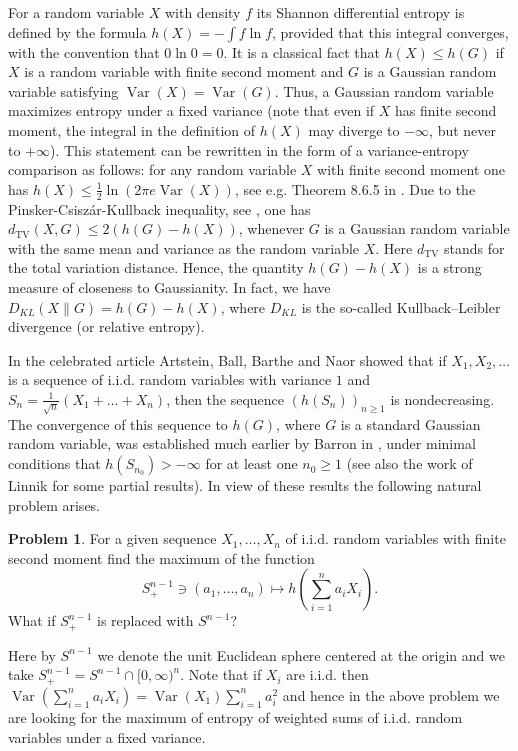 \documentclass[11pt]{amsart}
\newcommand{\1}{\mathbf{1}}
\DeclareMathOperator{\var}{Var}
\theoremstyle{definition}
\newtheorem{prob}{Problem}
\theoremstyle{definition}
\theoremstyle{remark}
\begin{document}
For a random variable $X$ with density $f$ its Shannon differential entropy is defined by the formula $h(X)=-\int f \ln f$, provided that this integral converges, with the convention that $0 \ln 0 = 0$. It is a classical fact that $h(X) \leq h(G)$ if $X$ is a random variable with finite second moment and $G$ is a Gaussian random variable satisfying $\var(X)=\var(G)$. Thus, a Gaussian random variable maximizes entropy under a fixed variance (note that even if $X$ has finite second moment, the integral in the definition of $h(X)$ may diverge to $-\infty$, but never to $+\infty$). This statement can be rewritten in the form of a variance-entropy comparison as follows: for any random variable $X$ with finite second moment one has $h(X) \leq \frac12 \ln\left( 2\pi e \var(X) \right)$, see e.g. Theorem 8.6.5 in \cite{CT06}. Due to the Pinsker-Csisz\'ar-Kullback inequality, see \cite{P64,C62,K67}, one has $d_{\textrm{TV}}(X, G) \leq 2(h(G)-h(X))$, whenever $G$ is a Gaussian random variable with the same mean and variance as the random variable $X$. Here $d_{\textrm{TV}}$ stands for the total variation distance. Hence, the quantity $h(G)-h(X)$ is a strong measure of closeness to Gaussianity. In fact, we have $D_{KL}(X \| G) = h(G)-h(X)$, where $D_{KL}$ is the so-called Kullback–Leibler divergence (or relative entropy).   


In the celebrated article \cite{ABBN04} Artstein, Ball, Barthe and Naor showed that if $X_1, X_2, \ldots$ is a sequence of i.i.d. random variables with variance $1$ and $S_n = \frac{1}{\sqrt{n}}(X_1+\ldots+X_n)$, then the sequence $(h(S_n))_{n \geq 1}$ is nondecreasing. The convergence of this sequence to $h(G)$, where $G$ is a standard Gaussian random variable, was established much earlier by Barron in \cite{B86}, under minimal conditions that $h(S_{n_0})>-\infty$ for at least one $n_0 \ge 1$ (see also the work \cite{L59} of Linnik for some partial results). In view of these results the following natural problem arises.

\begin{prob}\label{prob:general}
For a given sequence $X_1, \ldots, X_n$ of i.i.d. random variables with finite second moment find the maximum of the function 
\[
S_+^{n-1} \ni (a_1,\ldots, a_n) \mapsto h\left(\sum_{i=1}^n a_i X_i\right).
\] 
What if $S_+^{n-1}$ is replaced with $S^{n-1}$? 
\end{prob}

\noindent Here by $S^{n-1}$ we denote the unit Euclidean sphere centered at the origin and  we take $S_+^{n-1}= S^{n-1} \cap [0,\infty)^n$. Note that if $X_i$ are i.i.d. then $\var(\sum_{i=1}^n a_i X_i) = \var(X_1) \sum_{i=1}^n a_i^2$ and hence in the above problem we are looking for the maximum of entropy of weighted sums of i.i.d. random variables under a fixed variance. 
\end{document}
